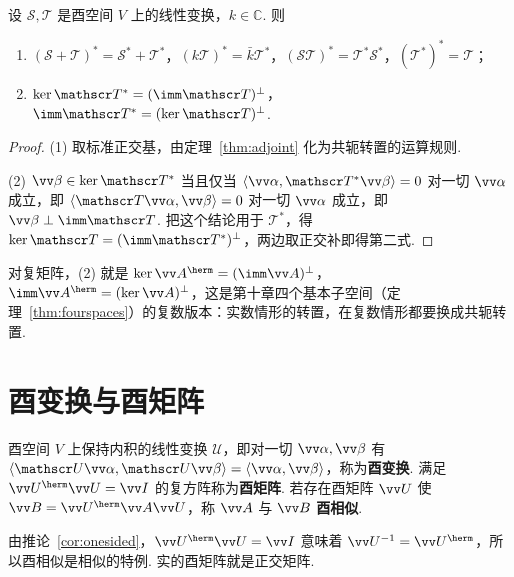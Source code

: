	\begin{proposition}\label{prop:adjointrules}
		设 $\mathscr S,\mathscr T$ 是酉空间 $V$ 上的线性变换，$k\in\mathbb{C}$. 则
		\begin{enumerate}
			\item $(\mathscr S+\mathscr T)^*=\mathscr S^*+\mathscr T^*$，$(k\mathscr T)^*=\bar k\mathscr T^*$，$(\mathscr{ST})^*=\mathscr T^*\mathscr S^*$，$(\mathscr T^*)^*=\mathscr T$；
			\item $\ker\mathscr T^*=(\imm\mathscr T)^\perp$，$\imm\mathscr T^*=(\ker\mathscr T)^\perp$.
		\end{enumerate}
	\end{proposition}
	\begin{proof}
		(1) 取标准正交基，由定理~\ref{thm:adjoint} 化为共轭转置的运算规则.
		
		(2) $\vv\beta\in\ker\mathscr T^*$ 当且仅当 $\langle\vv\alpha,\mathscr T^*\vv\beta\rangle=0$ 对一切 $\vv\alpha$ 成立，即 $\langle\mathscr T\vv\alpha,\vv\beta\rangle=0$ 对一切 $\vv\alpha$ 成立，即 $\vv\beta\perp\imm\mathscr T$. 把这个结论用于 $\mathscr T^*$，得 $\ker\mathscr T=(\imm\mathscr T^*)^\perp$，两边取正交补即得第二式.
	\end{proof}
	
	对复矩阵，(2) 就是 $\ker\vv A^\herm=(\imm\vv A)^\perp$，$\imm\vv A^\herm=(\ker\vv A)^\perp$，这是第十章四个基本子空间（定理~\ref{thm:fourspaces}）的复数版本：实数情形的转置，在复数情形都要换成共轭转置.
	
	\section{\hC 酉变换与酉矩阵}\label{sec:unitarymatrix}
	
	\begin{definition}
		酉空间 $V$ 上保持内积的线性变换 $\mathscr U$，即对一切 $\vv\alpha,\vv\beta$ 有 $\langle\mathscr U\vv\alpha,\mathscr U\vv\beta\rangle=\langle\vv\alpha,\vv\beta\rangle$，称为\textbf{酉变换}. 满足 $\vv U^\herm\vv U=\vv I$ 的复方阵称为\textbf{酉矩阵}. 若存在酉矩阵 $\vv U$ 使 $\vv B=\vv U^\herm\vv A\vv U$，称 $\vv A$ 与 $\vv B$ \textbf{酉相似}.
	\end{definition}
	
	由推论~\ref{cor:onesided}，$\vv U^\herm\vv U=\vv I$ 意味着 $\vv U^{-1}=\vv U^\herm$，所以酉相似是相似的特例. 实的酉矩阵就是正交矩阵.
	
